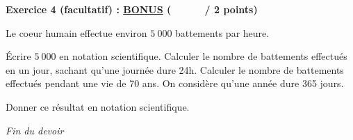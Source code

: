 \documentclass[12pt,a4paper]{exam}
\begin{document}
\vspace{20pt}

\noindent
\textbf{Exercice 4 (facultatif) : \underline{BONUS} (\ \ \ \ \ \  / 2 points)}
\vspace{5pt}

Le coeur humain effectue environ $5\ 000$ battements par heure.

\begin{questions}

    \question Écrire $5\ 000$ en notation scientifique.
    \question Calculer le nombre de battements effectués en un jour, sachant qu'une journée 
    dure 24h.
    \question Calculer le nombre de battements effectués pendant une vie de 70 ans. On considère 
    qu'une année dure 365 jours.
    \vspace{5pt}

    Donner ce résultat en notation scientifique.

\end{questions}

\vspace{20pt}

\begin{center}
    \textit{Fin du devoir}
\end{center}
\end{document}
